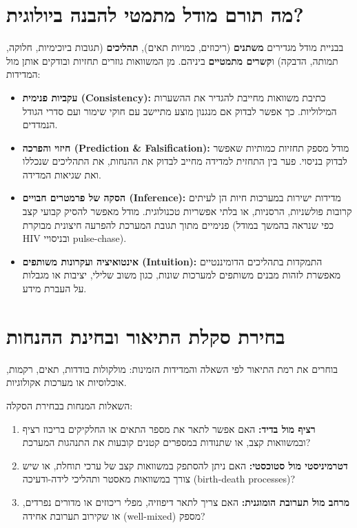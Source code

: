 \section{מה תורם מודל מתמטי להבנה ביולוגית?}\label{sec:mavo-purpose}
בבניית מודל מגדירים \textbf{משתנים} (ריכוזים, כמויות תאים), \textbf{תהליכים} (תגובות ביוכימיות, חלוקה, תמותה, הדבקה) ו\textbf{קשרים מתמטיים} ביניהם. מן המשוואות גוזרים תחזיות ובודקים אותן מול המדידות:

\begin{itemize}
\item \textbf{עקביות פנימית (\textenglish{Consistency}):} כתיבת משוואות מחייבת להגדיר את ההשערות המילוליות. כך אפשר לבדוק אם מנגנון מוצע מתיישב עם חוקי שימור ועם סדרי הגודל הנמדדים.
\item \textbf{חיזוי והפרכה (\textenglish{Prediction \& Falsification}):} מודל מספק תחזיות כמותיות שאפשר לבדוק בניסוי. פער בין התחזית למדידה מחייב לבדוק את ההנחות, את התהליכים שנכללו ואת שגיאות המדידה.
\item \textbf{הסקה של פרמטרים חבויים (\textenglish{Inference}):} מדידות ישירות במערכות חיות הן לעיתים קרובות פולשניות, הרסניות, או בלתי אפשריות טכנולוגית. מודל מאפשר להסיק קבועי קצב פנימיים מתוך תגובת המערכת להפרעה חיצונית מבוקרת (כפי שנראה בהמשך במודל HIV ובניסויי \textenglish{pulse-chase}).
\item \textbf{אינטואיציה ועקרונות משותפים (\textenglish{Intuition}):} התמקדות בתהליכים הדומיננטיים מאפשרת לזהות מבנים משותפים למערכות שונות, כגון משוב שלילי, יציבות או מגבלות על העברת מידע.
\end{itemize}

\section{בחירת סקלת התיאור ובחינת ההנחות}\label{sec:mavo-scale}
בוחרים את רמת התיאור לפי השאלה והמדידות הזמינות: מולקולות בודדות, תאים, רקמות, אוכלוסיות או מערכות אקולוגיות.

השאלות המנחות בבחירת הסקלה:
\begin{enumerate}
\item \textbf{רציף מול בדיד:} האם אפשר לתאר את מספר התאים או החלקיקים בריכוז רציף ובמשוואות קצב, או שתנודות במספרים קטנים קובעות את התנהגות המערכת?
\item \textbf{דטרמיניסטי מול סטוכסטי:} האם ניתן להסתפק במשוואות קצב של ערכי תוחלת, או שיש צורך במשוואות מאסטר ותהליכי לידה-ודעיכה (\textenglish{birth-death processes})?
\item \textbf{מרחב מול תערובת הומוגנית:} האם צריך לתאר דיפוזיה, מפלי ריכוזים או מדורים נפרדים, או שקירוב תערובת אחידה (\textenglish{well-mixed}) מספק?
\end{enumerate}

